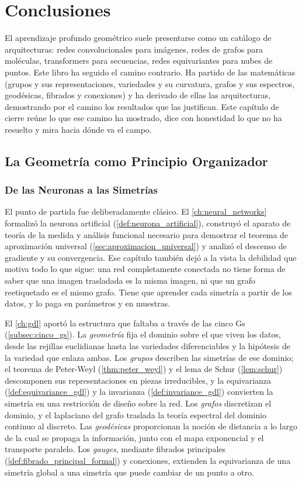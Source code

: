 \chapter{Conclusiones}\label{ch:conclusions}

El aprendizaje profundo geométrico suele presentarse como un catálogo de arquitecturas: redes convolucionales para imágenes, redes de grafos para moléculas, transformers para secuencias, redes equivariantes para nubes de puntos. Este libro ha seguido el camino contrario. Ha partido de las matemáticas (grupos y sus representaciones, variedades y su curvatura, grafos y sus espectros, geodésicas, fibrados y conexiones) y ha derivado de ellas las arquitecturas, demostrando por el camino los resultados que las justifican. Este capítulo de cierre reúne lo que ese camino ha mostrado, dice con honestidad lo que no ha resuelto y mira hacia dónde va el campo.


\section{La Geometría como Principio Organizador}

\subsection{De las Neuronas a las Simetrías}

El punto de partida fue deliberadamente clásico. El \autoref{ch:neural_networks} formalizó la neurona artificial (\autoref{def:neurona_artificial}), construyó el aparato de teoría de la medida y análisis funcional necesario para demostrar el teorema de aproximación universal (\autoref{sec:aproximacion_universal}) y analizó el descenso de gradiente y su convergencia. Ese capítulo también dejó a la vista la debilidad que motiva todo lo que sigue: una red completamente conectada no tiene forma de saber que una imagen trasladada es la misma imagen, ni que un grafo reetiquetado es el mismo grafo. Tiene que aprender cada simetría a partir de los datos, y lo paga en parámetros y en muestras.

El \autoref{ch:gdl} aportó la estructura que faltaba a través de las cinco Gs (\autoref{subsec:cinco_gs}). La \emph{geometría} fija el dominio sobre el que viven los datos, desde las rejillas euclidianas hasta las variedades diferenciables y la hipótesis de la variedad que enlaza ambas. Los \emph{grupos} describen las simetrías de ese dominio; el teorema de Peter-Weyl (\autoref{thm:peter_weyl}) y el lema de Schur (\autoref{lem:schur}) descomponen sus representaciones en piezas irreducibles, y la equivarianza (\autoref{def:equivariance_gdl}) y la invarianza (\autoref{def:invariance_gdl}) convierten la simetría en una restricción de diseño sobre la red. Los \emph{grafos} discretizan el dominio, y el laplaciano del grafo traslada la teoría espectral del dominio continuo al discreto. Las \emph{geodésicas} proporcionan la noción de distancia a lo largo de la cual se propaga la información, junto con el mapa exponencial y el transporte paralelo. Los \emph{gauges}, mediante fibrados principales (\autoref{def:fibrado_principal_formal}) y conexiones, extienden la equivarianza de una simetría global a una simetría que puede cambiar de un punto a otro.

